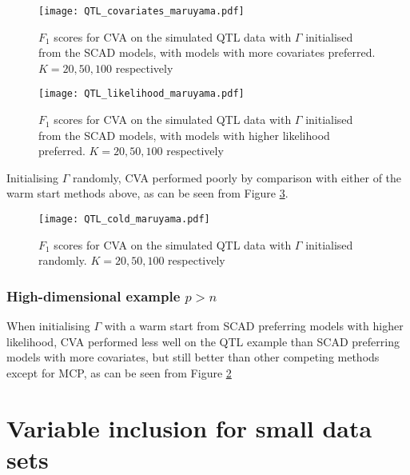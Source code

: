 \begin{figure}
\texttt{[image: QTL\_covariates\_maruyama.pdf]}
\label{fig:QTL_warm_start_covariates}
\caption{$F_1$ scores for CVA on the simulated QTL data with $\Gamma$ initialised from the SCAD models, with
models with more covariates preferred. $K=20, 50, 100$ respectively}
\end{figure}

\begin{figure}
\texttt{[image: QTL\_likelihood\_maruyama.pdf]}
\label{fig:QTL_warm_start_likelihood}
\caption{$F_1$ scores for CVA on the simulated QTL data with $\Gamma$ initialised from the SCAD models, with
models with higher likelihood preferred. $K=20, 50, 100$ respectively}
\end{figure}


Initialising $\Gamma$ randomly, CVA performed poorly by comparison with either of the warm start methods
above, as can be seen from Figure \ref{fig:QTL_cold_start}.
\begin{figure}
\texttt{[image: QTL\_cold\_maruyama.pdf]}
\label{fig:QTL_cold_start}
\caption{$F_1$ scores for CVA on the simulated QTL data with $\Gamma$ initialised randomly. $K=20, 50, 100$ respectively}
\end{figure}


\subsubsection{High-dimensional example $p > n$}
When initialising $\Gamma$ with a warm start from SCAD preferring models with higher likelihood,
CVA performed less well on the QTL example than SCAD preferring models with more covariates, but still
better than other competing methods except for MCP,
as can be seen from Figure \ref{fig:QTL_warm_start_likelihood}

\section{Variable inclusion for small data sets}

